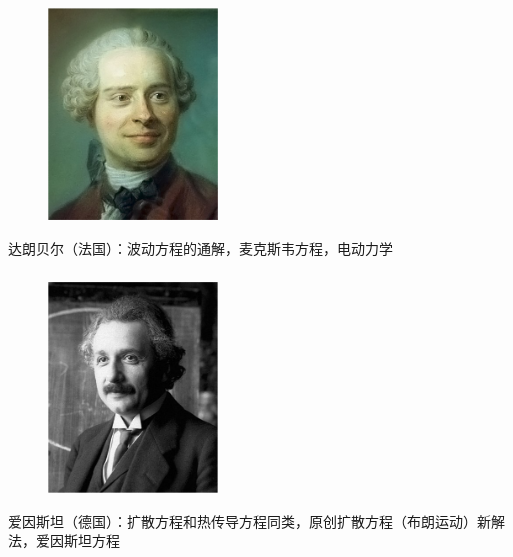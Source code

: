 \begin{frame}
	\frametitle{}
	\begin{center}
		\begin{figure}
			\includegraphics[width=4.5cm]{figs/fig1-3-7.png}	
		\end{figure}
	\end{center}
	{达朗贝尔（法国）：波动方程的通解，麦克斯韦方程，电动力学}
\end{frame}

\begin{frame}
	\frametitle{}
	\begin{center}
		\begin{figure}
			\includegraphics[width=4.5cm]{figs/fig1-3-8.png}	
		\end{figure}
	\end{center}
	{爱因斯坦（德国）：扩散方程和热传导方程同类，原创扩散方程（布朗运动）新解法，爱因斯坦方程}
\end{frame}

